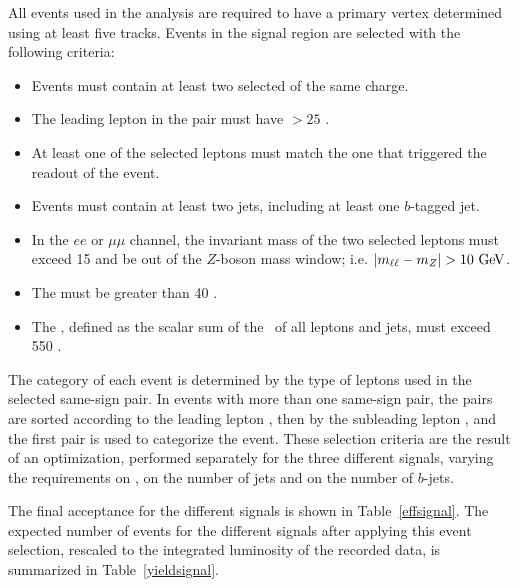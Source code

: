 All events used in the analysis are required to have a primary vertex determined using at least five tracks.
Events in the signal region are selected with the following criteria:
\begin{itemize}
\item Events must contain at least two selected of the same charge. 
\item The leading lepton in the pair must have \pT $>25$ \GeV{}.
\item At least one of the selected leptons must match the one that triggered the readout of the event.
\item Events must contain at least two jets, including at least one $b$-tagged jet.
\item In the $ee$ or $\mu\mu$ channel, the invariant mass of the two selected leptons must exceed 15 \GeV{} and be out of the $Z$-boson mass window; i.e. $|m_{\ell\ell} - m_Z| > 10 \GeV$.
\item The \met{} must be greater than 40 \GeV{}.
\item The \HT{}, defined as the scalar sum of the \pt\  of all leptons and jets, must exceed 550 \GeV{}.
\end{itemize}
The category of each event is determined by the type of leptons used in the selected same-sign pair.
In events with more than one same-sign pair, the pairs are sorted according to the leading lepton \pT, then by the subleading lepton \pT, and the first pair is used to categorize the event.
These selection criteria are the result of an optimization, performed separately for the three different signals, varying the requirements on \HT{}, on the number of jets and on the number of $b$-jets.

The final acceptance for the different signals is shown in Table~\ref{effsignal}.
The expected number of events for the different signals after applying this event selection, rescaled to the integrated luminosity of the recorded data, is summarized in Table~\ref{yieldsignal}.

